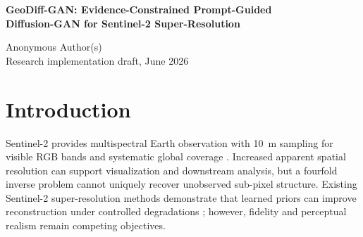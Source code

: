 \documentclass[10pt]{article}
\begin{document}
\begin{center}
{\LARGE\bfseries\color{geoblue}
GeoDiff-GAN: Evidence-Constrained Prompt-Guided\\
Diffusion-GAN for Sentinel-2 Super-Resolution\par}
\vspace{4pt}
{\large Anonymous Author(s)}\\
{\small Research implementation draft, June 2026}
\end{center}

\begin{abstract}
Fourfold satellite image super-resolution is fundamentally ill posed: many native-resolution
scenes can produce nearly identical low-resolution observations after optical blur, sampling,
noise, and quantization. Deterministic models often suppress uncertain high-frequency detail,
whereas adversarial and diffusion models can produce perceptually plausible but spatially
unsupported structure. We propose \emph{GeoDiff-GAN}, a prompt-optional architecture for synthetic
\SI{40}{m}-to-\SI{10}{m} Sentinel-2 L2A RGB super-resolution. The model decomposes reconstruction
into a deterministic SwinIR-style base and a stochastic residual path. A degradation-conditioned
latent diffusion model samples a compact residual representation; a GeoMapper converts it into
spatial content, four layer-wise FiLM controls, an LR-supported evidence-confidence map, and a
separate prompt-conditioned edit-permission map. A dual-head adversarial decoder predicts
high-frequency reconstruction detail independently from full-band synthetic edits. In SR mode,
detail is confidence-gated and the output undergoes iterative sensor back-projection. Across
stochastic samples, disagreement triggers abstention toward the deterministic base. Edit mode
activates only the permission-gated edit head and labels its output as synthetic. This first part of the
manuscript defines the data model, architecture, training curriculum, and pre-registered
evaluation. Quantitative claims are deferred until geographically separated tile-level
experiments and ablations are complete.
\end{abstract}

\section{Introduction}
Sentinel-2 provides multispectral Earth observation with \SI{10}{m} sampling for visible RGB
bands and systematic global coverage \citep{drusch2012sentinel}. Increased apparent spatial
resolution can support visualization and downstream analysis, but a fourfold inverse problem
cannot uniquely recover unobserved sub-pixel structure. Existing Sentinel-2 super-resolution
methods demonstrate that learned priors can improve reconstruction under controlled degradations
\citep{lanaras2018super}; however, fidelity and perceptual realism remain competing objectives.
\end{document}
